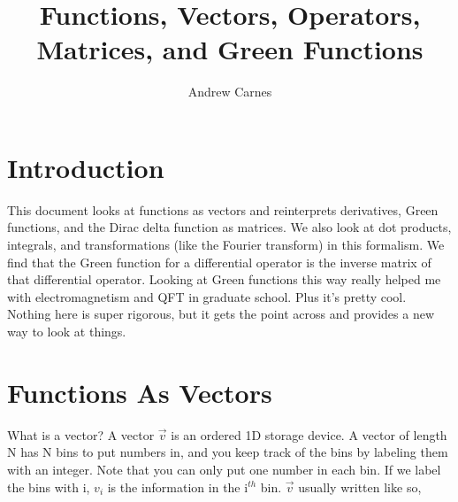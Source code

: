 \documentclass[12pt]{article}
\begin{document}
\title{Functions, Vectors, Operators, Matrices, and Green Functions}
\author{Andrew Carnes}

\maketitle

\newpage
\tableofcontents
\newpage

\section{Introduction} \label{intro}

This document looks at functions as vectors and reinterprets derivatives, Green functions, and the Dirac delta function as matrices. We also look at dot products, integrals, and transformations (like the Fourier transform) in this formalism. We find that the Green function for a differential operator is the inverse matrix of that differential operator. Looking at Green functions this way really helped me with electromagnetism and QFT in graduate school. Plus it's pretty cool. Nothing here is super rigorous, but it gets the point across and provides a new way to look at things.

\section{Functions As Vectors}  

What is a vector? A vector $\vec{v}$ is an ordered 1D storage device. A vector of length N has N bins to put numbers in, and you keep track of the bins by labeling them with an integer. Note that you can only put one number in each bin. If we label the bins with i, $v_i$ is the information in the i$^{th}$ bin. $\vec{v}$ usually written like so, 
\end{document}
